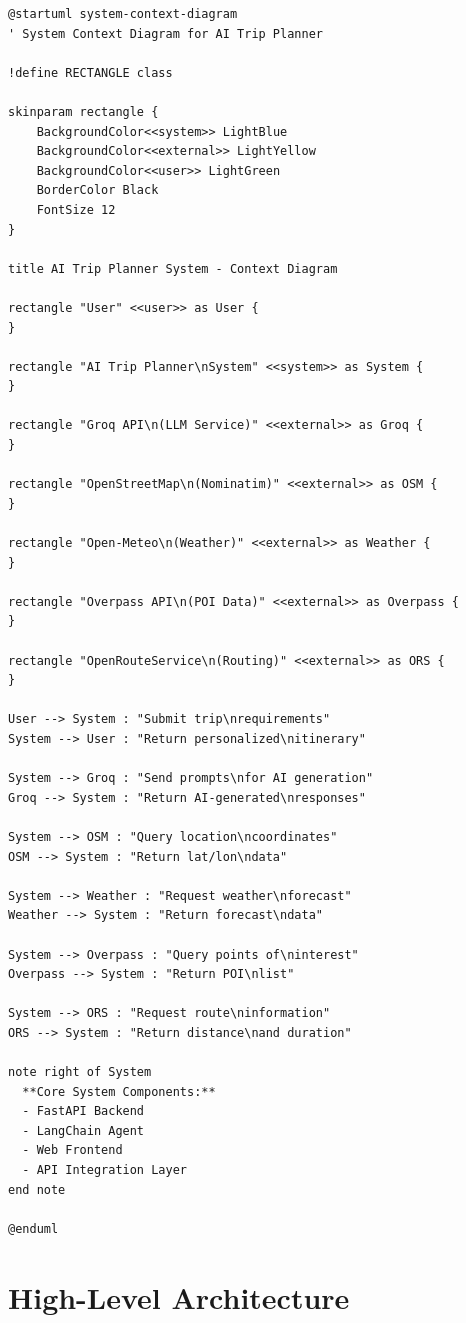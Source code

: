 \documentclass[12pt,a4paper]{report}
\begin{document}
\begin{lstlisting}[style=pythonstyle, caption={System Context Diagram - PlantUML Code}, language={}]
@startuml system-context-diagram
' System Context Diagram for AI Trip Planner

!define RECTANGLE class

skinparam rectangle {
    BackgroundColor<<system>> LightBlue
    BackgroundColor<<external>> LightYellow
    BackgroundColor<<user>> LightGreen
    BorderColor Black
    FontSize 12
}

title AI Trip Planner System - Context Diagram

rectangle "User" <<user>> as User {
}

rectangle "AI Trip Planner\nSystem" <<system>> as System {
}

rectangle "Groq API\n(LLM Service)" <<external>> as Groq {
}

rectangle "OpenStreetMap\n(Nominatim)" <<external>> as OSM {
}

rectangle "Open-Meteo\n(Weather)" <<external>> as Weather {
}

rectangle "Overpass API\n(POI Data)" <<external>> as Overpass {
}

rectangle "OpenRouteService\n(Routing)" <<external>> as ORS {
}

User --> System : "Submit trip\nrequirements"
System --> User : "Return personalized\nitinerary"

System --> Groq : "Send prompts\nfor AI generation"
Groq --> System : "Return AI-generated\nresponses"

System --> OSM : "Query location\ncoordinates"
OSM --> System : "Return lat/lon\ndata"

System --> Weather : "Request weather\nforecast"
Weather --> System : "Return forecast\ndata"

System --> Overpass : "Query points of\ninterest"
Overpass --> System : "Return POI\nlist"

System --> ORS : "Request route\ninformation"
ORS --> System : "Return distance\nand duration"

note right of System
  **Core System Components:**
  - FastAPI Backend
  - LangChain Agent
  - Web Frontend
  - API Integration Layer
end note

@enduml
\end{lstlisting}

\section{High-Level Architecture}
\end{document}
